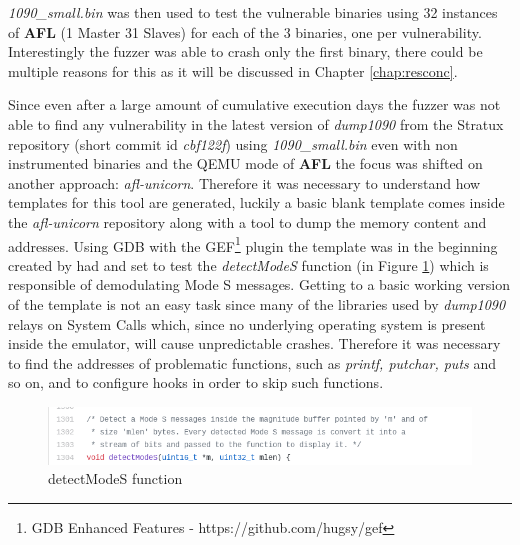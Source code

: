 \documentclass[../main.tex]{subfiles}
\begin{document}
\textit{1090\_small.bin} was then used to test the vulnerable binaries using 32
instances of \textbf{AFL} (1 Master 31 Slaves) for each of the 3 binaries, one
per vulnerability. Interestingly the fuzzer was able to crash only the first
binary, there could be multiple reasons for this as it will be discussed in
Chapter \ref{chap:resconc}.

Since even after a large amount of cumulative execution days the fuzzer was not
able to find any vulnerability in the latest version of \textit{dump1090} from
the Stratux repository (short commit id \textit{cbf122f}) using
\textit{1090\_small.bin} even with non instrumented binaries and the QEMU mode
of \textbf{AFL} the focus was shifted on another approach: \textit{afl-unicorn}.
Therefore it was necessary to understand how templates for this tool are
generated, luckily a basic blank template comes inside the \textit{afl-unicorn}
repository along with a tool to dump the memory content and addresses. Using GDB
with the GEF\footnote{GDB Enhanced Features - https://github.com/hugsy/gef}
plugin the template was in the beginning created by had and set to test the
\textit{detectModeS} function (in Figure \ref{fig:detectms}) which is
responsible of demodulating Mode S messages. Getting to a basic working version
of the template is not an easy task since many of the libraries used by
\textit{dump1090} relays on System Calls which, since no underlying operating
system is present inside the emulator, will cause unpredictable crashes.
Therefore it was necessary to find the addresses of problematic functions, such
as \textit{printf, putchar, puts} and so on, and to configure hooks in order to
skip such functions.

\begin{figure}[htp]
  \centering
  \includegraphics[scale=0.9]{images/detectModeS.png}
  \caption{detectModeS function}
  \label{fig:detectms}
\end{figure}
\end{document}
